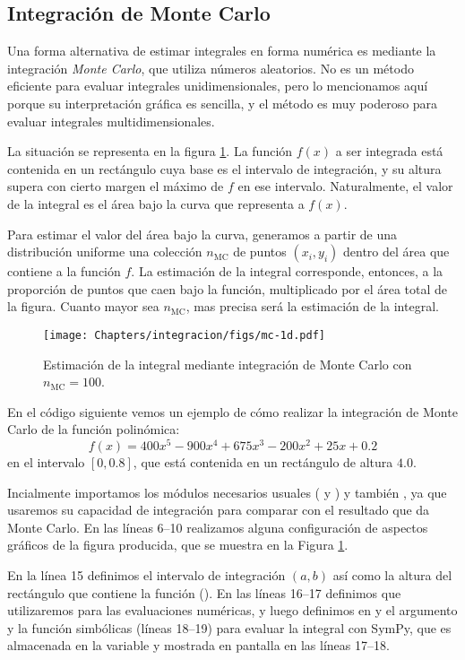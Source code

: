 \subsection{Integración de Monte Carlo}\label{sec:intMC1d}
Una forma alternativa de estimar integrales en forma numérica es mediante la integración \textit{Monte Carlo}, que utiliza números aleatorios. No es un método eficiente para evaluar integrales unidimensionales, pero lo mencionamos aquí porque su interpretación gráfica es sencilla, y el método es muy poderoso para evaluar integrales multidimensionales.

La situación se representa en la figura \ref{fig:intMC}. La función $f(x)$ a ser integrada está contenida en un rectángulo cuya base es el intervalo de integración, y su altura supera con cierto margen el máximo de $f$ en ese intervalo. Naturalmente, el valor de la integral es el área bajo la curva que representa a $f(x)$. 

Para estimar el valor del área bajo la curva, generamos a partir de una distribución uniforme una colección $n_{\text{MC}}$ de puntos $(x_i, y_i)$ dentro del área que contiene a la función $f$. La estimación de la integral corresponde, entonces, a la proporción de puntos que caen bajo la función, multiplicado por el área total de la figura. Cuanto mayor sea $n_{\text{MC}}$, mas precisa será la estimación de la integral.

\begin{figure}[ht]
 \centering
 \texttt{[image: Chapters/integracion/figs/mc-1d.pdf]}
 \caption{Estimación de la integral mediante integración de Monte Carlo con $n_{\text{MC}} = 100$.}
 \label{fig:intMC}
\end{figure}

En el código siguiente vemos un ejemplo de cómo realizar la integración de Monte Carlo de la función polinómica:
\[ f(x) = 400 x^5 - 900 x^4 + 675 x^3 - 200 x^2 + 25 x + 0.2 \]
en el intervalo $[0, 0.8]$, que está contenida en un rectángulo de altura $4.0$. 

Incialmente importamos los módulos necesarios usuales ( y ) y también , ya que usaremos su capacidad de integración para comparar con el resultado que da Monte Carlo. En las líneas 6--10 realizamos alguna configuración de aspectos gráficos de la figura producida, que se muestra en la Figura \ref{fig:intMC}.

En la línea 15 definimos el intervalo de integración $(a, b)$ así como la altura del rectángulo que contiene la función (). En las líneas 16--17 definimos  que utilizaremos para las evaluaciones numéricas, y luego definimos en  y  el argumento y la función simbólicas (líneas 18--19) para evaluar la integral con SymPy, que es almacenada en la variable  y mostrada en pantalla en las líneas 17--18.

